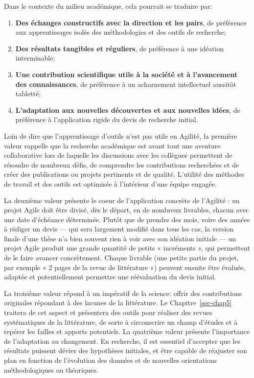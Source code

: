 \documentclass[
  letterpaper,
  DIV=11,
  numbers=noendperiod,
  oneside]{scrreprt}
\providecommand{\tightlist}{%
  \setlength{\itemsep}{0pt}\setlength{\parskip}{0pt}}\usepackage{longtable,booktabs,array}
\begin{document}
Dans le contexte du milieu académique, cela pourrait se traduire par:

\begin{enumerate}
\def\labelenumi{\arabic{enumi}.}
\tightlist
\item
  \textbf{Des échanges constructifs avec la direction et les pairs}, de
  préférence aux apprentissages isolés des méthodologies et des outils
  de recherche;
\item
  \textbf{Des résultats tangibles et réguliers}, de préférence à une
  idéation interminable;
\item
  \textbf{Une contribution scientifique utile à la société et à
  l'avancement des connaissances}, de préférence à un acharnement
  intellectuel aussitôt tabletté;
\item
  \textbf{L'adaptation aux nouvelles découvertes et aux nouvelles
  idées}, de préférence à l'application rigide du devis de recherche
  initial.
\end{enumerate}

Loin de dire que l'apprentissage d'outils n'est pas utile en Agilité, la
première valeur rappelle que la recherche académique est avant tout une
aventure collaborative lors de laquelle les discussions avec les
collègues permettent de résoudre de nombreux défis, de comprendre les
contributions recherchées et de créer des publications ou projets
pertinents et de qualité. L'utilité des méthodes de travail et des
outils est optimisée à l'intérieur d'une équipe engagée.

La deuxième valeur présente le coeur de l'application concrète de
l'Agilité : un projet Agile doit être divisé, dès le départ, en de
nombreux livrables, chacun avec une date d'échéance déterminée. Plutôt
que de prendre des mois, voire des années à rédiger un devis --- qui
sera largement modifié dans tous les cas, la version finale d'une thèse
n'a bien souvent rien à voir avec son idéation initiale --- un projet
Agile produit une grande quantité de petits « incréments », qui
permettent de le faire avancer concrètement. Chaque livrable (une petite
partie du projet, par exemple « 2 pages de la revue de littérature »)
peuvent ensuite être évaluée, adaptée et potentiellement permettre une
réévaluation du devis initial.

La troisième valeur répond à un impératif de la science: offrir des
contributions originales répondant à des lacunes de la littérature. Le
Chapitre~\ref{sec-chap5} traitera de cet aspect et présentera des outils
pour réaliser des revues systématiques de la littérature, de sorte à
circonscrire un champ d'études et à repérer les failles et apports
potentiels. La quatrième valeur présente l'importance de l'adaptation au
changement. En recherche, il est essentiel d'accepter que les résultats
puissent dévier des hypothèses initiales, et être capable de réajuster
son plan en fonction de l'évolution des données et de nouvelles
orientations méthodologiques ou théoriques.
\end{document}
